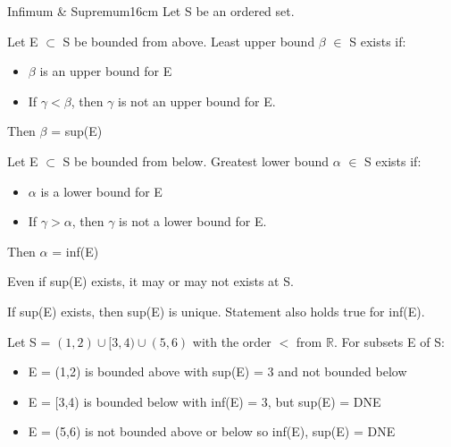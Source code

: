 	\vspace{0.5cm}



	\begin{definition}{Infimum \& Supremum}{16cm}
		Let S be an ordered set.

		Let E $ \subset $ S be bounded from above.
		{\color{lblue} Least upper bound} $\beta$ $\in$ S exists if:
		
		\begin{itemize}[leftmargin=1cm, itemsep=0.1cm]
			\item $\beta$ is an upper bound for E
		
			\item If $\gamma < \beta$, then $ \gamma $ is not an upper bound for E.
		\end{itemize}

		Then $\beta$ = sup(E)

		\vspace{0.3cm}

		Let E $\subset$ S be bounded from below.
		{\color{lblue} Greatest lower bound} $\alpha$ $\in$ S exists if:
		
		\begin{itemize}[leftmargin=1cm , itemsep=0.1cm]
			\item $\alpha$ is a lower bound for E

			\item If $\gamma > \alpha$, then $\gamma$ is not a lower bound for E.
		\end{itemize}

		Then $\alpha$ = inf(E)

		\vspace{0.3cm}

		Even if sup(E) exists, it may or may not exists at S.

		If sup(E) exists, then sup(E) is unique.
		Statement also holds true for inf(E).
	\end{definition}
	
	\vspace{0.5cm}



	\begin{example}
		Let S = $ (1,2) \cup [3,4) \cup (5,6) $ with the
		order $ < $ from $ \mathbb{R} $. For subsets E of S:

		\begin{itemize}[leftmargin=1cm, itemsep=0.1cm]
			\item E = (1,2) is bounded above with sup(E) = 3 and not bounded below
		
			\item E = [3,4) is bounded below with inf(E) = 3, but sup(E) = DNE

			\item E = (5,6) is not bounded above or below so inf(E), sup(E) = DNE
		\end{itemize}	
	\end{example}

